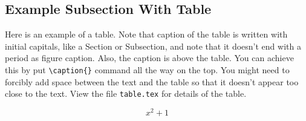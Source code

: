 \newpage
\subsection{Example Subsection With Table}

Here is an example of a table. Note that caption of the table is written with initial capitals, like  a Section or Subsection, and note that it doesn't end with a period as figure caption. Also, the caption is above the table.  You can achieve this by put \verb#\caption{}# command all the way on the top.  You might need to forcibly add space between the text and the table so that it doesn't appear too close to the text.  View the file \texttt{table.tex} for details of the table.
\vspace{4mm}




\begin{equation}
x^2+1
\end{equation}

